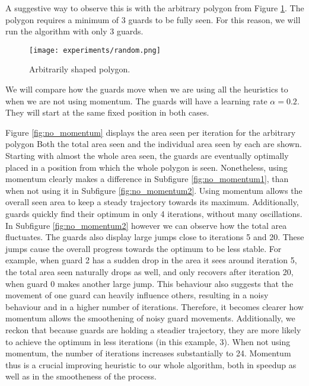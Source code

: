 A suggestive way to observe this is with the arbitrary polygon from Figure \ref{fig:random}. The polygon requires a minimum of 3 guards to be fully seen. For this reason, we will run the algorithm with only 3 guards.

\begin{figure}[h!]
    \centering
    \texttt{[image: experiments/random.png]}
    \caption{Arbitrarily shaped polygon.}
    \label{fig:random}
\end{figure}

We will compare how the guards move when we are using all the heuristics to when we are not using momentum. The guards will have a learning rate $\alpha = 0.2$. They will start at the same fixed position in both cases.

Figure \ref{fig:no_momentum} displays the area seen per iteration for the arbitrary polygon Both the total area seen and the individual area seen by each are shown. Starting with almost the whole area seen, the guards are eventually optimally placed in a position from which the whole polygon is seen. Nonetheless, using momentum clearly makes a difference in Subfigure \ref{fig:no_momentum1}, than when not using it in Subfigure \ref{fig:no_momentum2}. Using momentum allows the overall seen area to keep a steady trajectory towards its maximum. Additionally, guards quickly find their optimum in only 4 iterations, without many oscillations. In Subfigure \ref{fig:no_momentum2} however we can observe how the total area fluctuates. The guards also display large jumps close to iterations 5 and 20. These jumps cause the overall progress towards the optimum to be less stable. For example, when guard 2 has a sudden drop in the area it sees around iteration 5, the total area seen naturally drops as well, and only recovers after iteration 20, when guard 0 makes another large jump. This behaviour also suggests that the movement of one guard can heavily influence others, resulting in a noisy behaviour and in a higher number of iterations.
Therefore, it becomes clearer how momentum allows the smoothening of noisy guard movements. Additionally, we reckon that because guards are holding a steadier trajectory, they are more likely to achieve the optimum in less iterations (in this example, 3). When not using momentum, the number of iterations increases substantially to 24. Momentum thus is a crucial improving heuristic to our whole algorithm, both in speedup as well as in the smootheness of the process.

